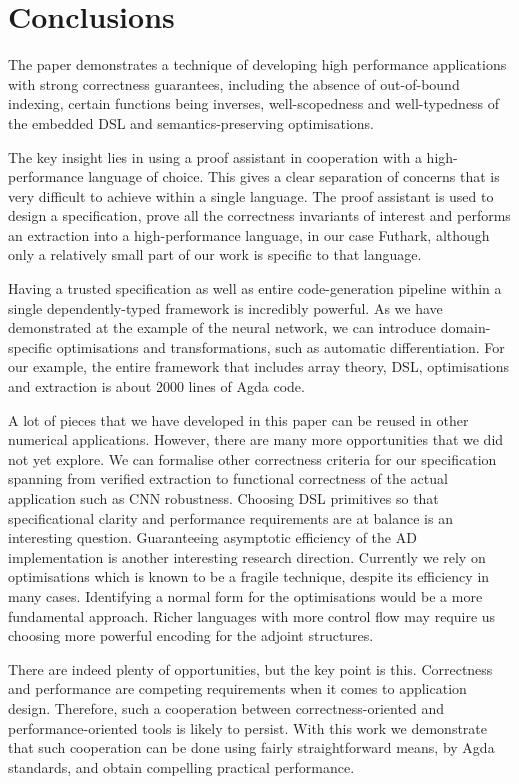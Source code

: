 \section{Conclusions\label{sec:conclusions}}

The paper demonstrates a technique of developing high performance
applications with strong correctness guarantees, including the absence
of out-of-bound indexing, certain functions being inverses,
well-scopedness and well-typedness of the embedded DSL and
semantics-preserving optimisations.

The key insight lies in using a proof assistant in cooperation with a
high-performance language of choice. This gives a clear separation of
concerns that is very difficult to achieve within a single language.
The proof assistant is used to design a specification, prove all the
correctness invariants of interest and performs an extraction into a
high-performance language, in our case Futhark, although only a
relatively small part of our work is specific to that language.

Having a trusted specification as well as entire code-generation
pipeline within a single dependently-typed framework is incredibly
powerful. As we have demonstrated at the example of the neural
network, we can introduce domain-specific optimisations and
transformations, such as automatic differentiation. For our example,
the entire framework that includes array theory, DSL, optimisations
and extraction is about 2000 lines of Agda code.

A lot of pieces that we have developed in this paper can be reused in
other numerical applications. However, there are many more
opportunities that we did not yet explore. We can formalise other
correctness criteria for our specification spanning from verified
extraction to functional correctness of the actual application such
as CNN robustness.
Choosing DSL primitives so that specificational clarity and
performance requirements are at balance is an interesting question.
Guaranteeing asymptotic efficiency of the AD implementation is another
interesting research direction.  Currently we rely on
optimisations which is known to be a fragile technique, despite its efficiency 
in many cases.  Identifying a normal form for the optimisations would
be a more fundamental approach.  Richer languages with more
control flow may require us choosing more powerful
encoding for the adjoint structures.


There are indeed plenty of opportunities, but the key point is this.
Correctness and performance are competing requirements when it comes
to application design. Therefore, such a cooperation between
correctness-oriented and performance-oriented tools is likely to
persist. With this work we demonstrate that such cooperation can be
done using fairly straightforward means, by Agda standards, and obtain
compelling practical performance.

